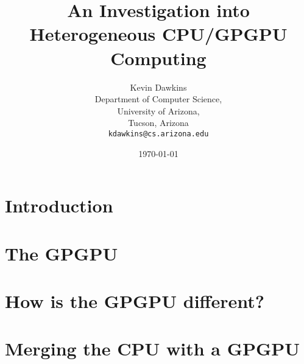 \documentclass[12pt,notitlepage]{report}
\begin{document}
\setcounter{tocdepth}{4}

\title{An Investigation into Heterogeneous CPU/GPGPU Computing}
\author{Kevin Dawkins\\
  Department of Computer Science,\\
  University of Arizona,\\
  Tucson, Arizona\\
  \texttt{kdawkins@cs.arizona.edu}}
\date{\today}
\maketitle



\tableofcontents

\chapter*{Introduction}


\chapter*{The GPGPU}


\chapter*{How is the GPGPU different?}


\chapter*{Merging the CPU with a GPGPU}


\nocite{nvidia, mapreduce, cpuassist}



\end{document}
